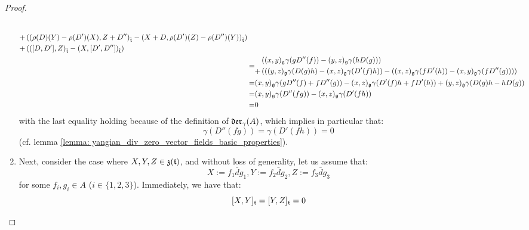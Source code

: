 \begin{proof}
\begin{enumerate}
$$\begin{aligned}
\begin{aligned}
                                    \\
                                    + & \left( \left(\rho(D)(Y) - \rho(D')(X), Z + D'' \right)_{\hat{\mathfrak{t}}} - \left( X + D, \rho(D')(Z) - \rho(D'')(Y) \right)_{\hat{\mathfrak{t}}} \right)
                                    \\
                                    + & \left( \left( [D, D'], Z \right)_{\hat{\mathfrak{t}}} - \left(X, [D', D'']\right)_{\hat{\mathfrak{t}}} \right)
                                \end{aligned}
                                \\
                                = & 
                                \begin{aligned}
                                    & \left( (x, y)_{\mathfrak{g}} \gamma( g D''(f) ) - (y, z)_{\mathfrak{g}} \gamma( h D(g) ) \right)
                                    \\
                                    + & \left( \left( (y, z)_{\mathfrak{g}} \gamma( D(g) h ) - (x, z)_{\mathfrak{g}} \gamma( D'(f) h ) \right) - \left( (x, z)_{\mathfrak{g}} \gamma( f D'(h) ) - (x, y)_{\mathfrak{g}} \gamma( f D''(g) ) \right) \right)
                                \end{aligned}
                                \\
                                = & (x, y)_{\mathfrak{g}} \gamma( g D''(f) + f D''(g) ) - (x, z)_{\mathfrak{g}} \gamma( D'(f) h + f D'(h) ) + (y, z)_{\mathfrak{g}} \gamma( D(g) h - h D(g) )
                                \\
                                = & (x, y)_{\mathfrak{g}} \gamma( D''(fg) ) - (x, z)_{\mathfrak{g}} \gamma( D'(fh) )
                                \\
                                = & 0
                            \end{aligned}
                        $$
                    with the last equality holding because of the definition of $\mathfrak{der}_{\gamma}(A)$, which implies in particular that:
                        $$\gamma( D''(fg) ) = \gamma( D'(fh) ) = 0$$
                    (cf. lemma \ref{lemma: yangian_div_zero_vector_fields_basic_properties}).
                    \item Next, consider the case where $X, Y, Z \in \mathfrak{z}(\mathfrak{t})$, and without loss of generality, let us assume that:
                        $$X := f_1\bar{d}g_1, Y := f_2\bar{d}g_2, Z := f_3\bar{d}g_3$$
                    for some $f_i, g_i \in A$ ($i \in \{1, 2, 3\}$). Immediately, we have that:
                        $$[X, Y]_{\mathfrak{t}} = [Y, Z]_{\mathfrak{t}} = 0$$

\end{enumerate}
\end{proof}
